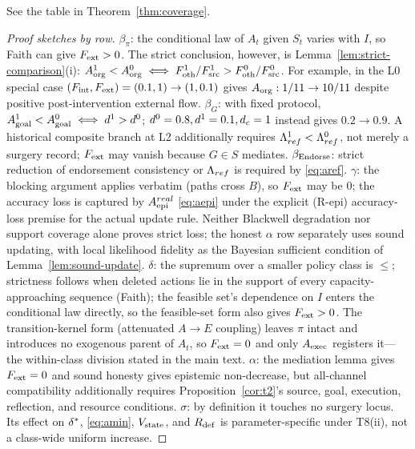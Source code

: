 \begin{theorem}
See the table in Theorem~\ref{thm:coverage}.
\end{theorem}
\begin{proof}[Proof sketches by row]
$\beta_\pi$: the conditional law of $A_t$ given $S_t$ varies with $I$, so
Faith can give $F_{\mathrm{ext}}>0$. The strict conclusion, however, is
Lemma~\ref{lem:strict-comparison}(i):
$A_{\mathrm{org}}^1<A_{\mathrm{org}}^0\iff F_{\mathrm{oth}}^1/F_{\mathrm{src}}^1>F_{\mathrm{oth}}^0/F_{\mathrm{src}}^0$. For example,
in the L0 special case $(F_{\mathrm{int}},F_{\mathrm{ext}})=(0.1,1)\to(1,0.1)$ gives
$A_{\mathrm{org}}:1/11\to10/11$ despite positive post-intervention external flow. $\beta_G$: with fixed protocol,
$A_{\mathrm{goal}}^1<A_{\mathrm{goal}}^0\iff d^1>d^0$; $d^0=0.8,d^1=0.1,d_{c}=1$ instead gives
$0.2\to0.9$. A historical composite branch at L2 additionally requires
$\Lambda_{ref}^1<\Lambda_{ref}^0$, not merely a surgery record; $F_{\mathrm{ext}}$ may vanish
because $G\in S$ mediates. $\beta_{\mathrm{Endorse}}$: strict reduction of
endorsement consistency or $\Lambda_{ref}$ is required by \eqref{eq:aref}.
$\gamma$: the blocking argument
applies verbatim (paths cross $B$), so $F_{\mathrm{ext}}$ may be $0$; the accuracy loss
is captured by $A_{\mathrm{epi}}^{real}$ \eqref{eq:aepi} under the explicit (R-epi)
accuracy-loss premise for the actual update rule. Neither Blackwell
degradation nor support coverage alone proves strict loss; the honest
$\alpha$ row separately uses sound updating, with local likelihood fidelity
as the Bayesian sufficient condition of Lemma~\ref{lem:sound-update}.
$\delta$: the supremum over a
smaller policy class is $\le$; strictness follows when deleted actions lie in
the support of every capacity-approaching sequence (Faith); the feasible set's dependence on $I$
enters the conditional law directly, so the feasible-set form also gives
$F_{\mathrm{ext}}>0$. The transition-kernel form (attenuated $A\to E$ coupling) leaves
$\pi$ intact and introduces no exogenous parent of $A_t$, so $F_{\mathrm{ext}}=0$ and
only $A_{\mathrm{exec}}$ registers it---the within-class division stated in the main
text. $\alpha$: the mediation lemma gives $F_{\mathrm{ext}}=0$ and sound honesty gives
epistemic non-decrease, but all-channel compatibility additionally requires
Proposition~\ref{cor:t2}'s source, goal, execution, reflection, and resource
conditions. $\sigma$: by definition it touches no surgery locus. Its effect on
$\delta^{*}$, \eqref{eq:amin}, $V_{\mathrm{state}}$, and $R_{\mathrm{def}}$ is parameter-specific under
T8(ii), not a class-wide uniform increase.
\end{proof}

